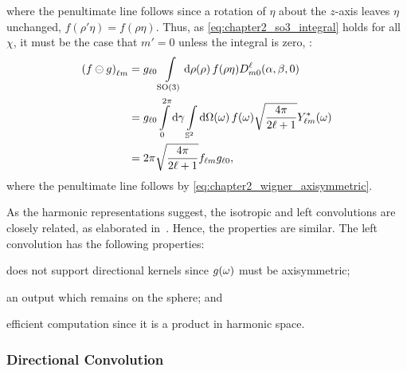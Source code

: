 %
where the penultimate line follows since a rotation of \({\eta}\) about the \(z\)-axis leaves \({\eta}\) unchanged, \ie{} \(f(\rho'\eta) = f(\rho\eta)\).
Thus, as \cref{eq:chapter2_so3_integral} holds for all \(\chi{}\), it must be the case that \(m'=0\) unless the integral is zero, \ie{}:
%
\begin{align}
	{(f \circleddash g)}_{\ell m}
	 & = {g}_{\ell 0} \int\limits_{\text{SO(3)}} \dd{\rho(\rho)} f(\rho\eta) D^{\ell}_{m0} (\alpha,\beta,0) \nonumber{}                                               \\
	 & = {g}_{\ell 0} \int\limits_{0}^{2\pi} \dd{\gamma} \int\limits_{\mathbb{S}^{2}} \dd{\Omega(\omega)} f(\omega) \sqrt{\frac{4\pi}{2\ell+1}} {Y}_{\ell m}^{\ast}(\omega) \nonumber{} \\
	 & = 2\pi \sqrt{\frac{4\pi}{2\ell+1}} {f}_{\ell m} {g}_{\ell 0},
\end{align}
%
where the penultimate line follows by \cref{eq:chapter2_wigner_axisymmetric}.

As the harmonic representations suggest, the isotropic and left convolutions are closely related, as elaborated in~\autocite{Kennedy2011}.
Hence, the properties are similar.
The left convolution has the following properties:
%
\begin{inparaenum}[(i)]
	\item does not support directional kernels since \(g(\omega)\) must be axisymmetric;
	\item an output which remains on the sphere; and
	\item efficient computation since it is a product in harmonic space.
\end{inparaenum}

\subsubsection{Directional Convolution}

